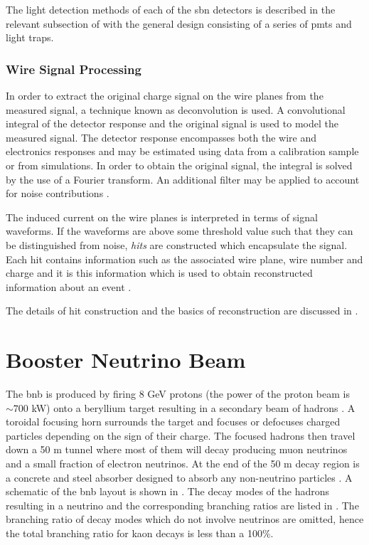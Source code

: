 The light detection methods of each of the \gls{sbn} detectors is described in the relevant subsection of  with the general design consisting of a series of \glspl{pmt} and light traps.

\subsubsection{Wire Signal Processing}
In order to extract the original charge signal on the wire planes from the measured signal, a technique known as deconvolution is used. A convolutional integral of the detector response and the original signal is used to model the measured signal. The detector response encompasses both the wire and electronics responses and may be estimated using data from a calibration sample or from simulations. In order to obtain the original signal, the integral is solved by the use of a Fourier transform. An additional filter may be applied to account for noise contributions \cite{Deconvolution}. 

The induced current on the wire planes is interpreted in terms of signal waveforms. If the waveforms are above some threshold value such that they can be distinguished from noise, \textit{hits} are constructed which encapsulate the signal. Each hit contains information such as the associated wire plane, wire number and charge and it is this information which is used to obtain reconstructed information about an event \cite{Design_and_Construction_of_the_MicroBooNE_Detector}.

The details of hit construction and the basics of reconstruction are discussed in .


\section{Booster Neutrino Beam}\label{sec:BNB}
The \gls{bnb} is produced by firing 8 GeV protons (the power of the proton beam is $\sim 700$ kW) onto a beryllium target resulting in a secondary beam of hadrons \cite{FNAL_proton_accelerator}. A toroidal focusing horn surrounds the target and focuses or defocuses charged particles depending on the sign of their charge. The focused hadrons then travel down a 50 m tunnel where most of them will decay producing muon neutrinos and a small fraction of electron neutrinos. At the end of the 50 m decay region is a concrete and steel absorber designed to absorb any non-neutrino particles \cite{SciBooNE_BNB_description}. A schematic of the \gls{bnb} layout is shown in . The decay modes of the hadrons resulting in a neutrino and the corresponding branching ratios are listed in . The branching ratio of decay modes which do not involve neutrinos are omitted, hence the total branching ratio for kaon decays is less than a 100\%.

